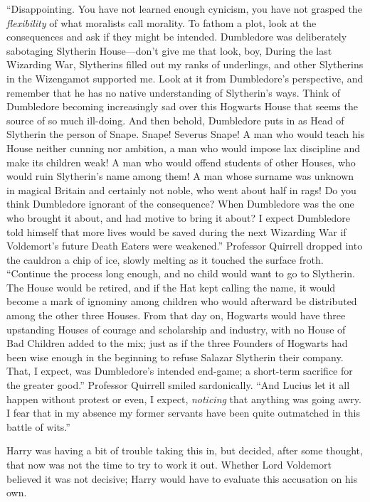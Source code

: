 “Disappointing. You have not learned enough cynicism, you have not grasped the
\emph{flexibility} of what moralists call morality. To fathom a plot, look at
the consequences and ask if they might be intended. Dumbledore was deliberately
sabotaging Slytherin House—don’t give me that look, boy,  During the last Wizarding War, Slytherins filled out my ranks of
underlings, and other Slytherins in the Wizengamot supported me. Look at it
from Dumbledore’s perspective, and remember that he has no native understanding
of Slytherin’s ways. Think of Dumbledore becoming increasingly sad over this
Hogwarts House that seems the source of so much ill-doing. And then behold,
Dumbledore puts in as Head of Slytherin the person of Snape. Snape! Severus
Snape! A man who would teach his House neither cunning nor ambition, a man who
would impose lax discipline and make its children weak! A man who would offend
students of other Houses, who would ruin Slytherin’s name among them! A man
whose surname was unknown in magical Britain and certainly not noble, who went
about half in rags! Do you think Dumbledore ignorant of the consequence? When
Dumbledore was the one who brought it about, and had motive to bring it about?
I expect Dumbledore told himself that more lives would be saved during the next
Wizarding War if Voldemort’s future Death Eaters were weakened.” Professor
Quirrell dropped into the cauldron a chip of ice, slowly melting as it touched
the surface froth. “Continue the process long enough, and no child would want
to go to Slytherin. The House would be retired, and if the Hat kept calling the
name, it would become a mark of ignominy among children who would afterward be
distributed among the other three Houses. From that day on, Hogwarts would have
three upstanding Houses of courage and scholarship and industry, with no House
of Bad Children added to the mix; just as if the three Founders of Hogwarts had
been wise enough in the beginning to refuse Salazar Slytherin their company.
That, I expect, was Dumbledore’s intended end-game; a short-term sacrifice for
the greater good.” Professor Quirrell smiled sardonically. “And Lucius let it
all happen without protest or even, I expect, \emph{noticing} that anything was
going awry. I fear that in my absence my former servants have been quite
outmatched in this battle of wits.”

Harry was having a bit of trouble taking this in, but decided, after some
thought, that now was not the time to try to work it out. Whether Lord
Voldemort believed it was not decisive; Harry would have to evaluate this
accusation on his own.

